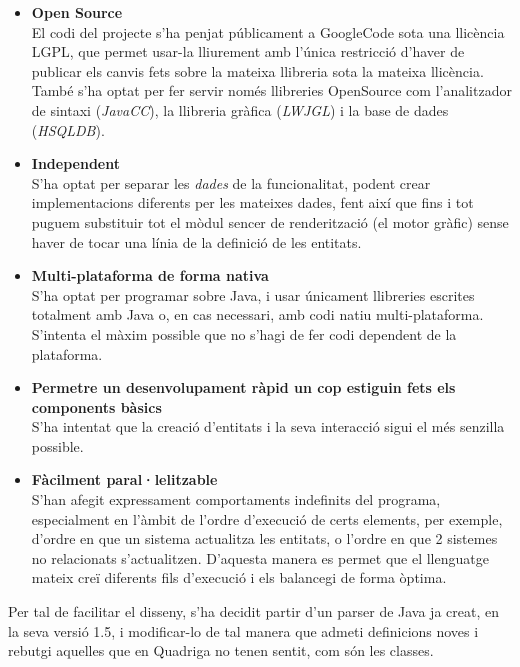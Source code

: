   \begin{itemize}
    \item {\bf Open Source} \hfill \\
      El codi del projecte s'ha penjat públicament a GoogleCode sota una llicència LGPL, que permet usar-la lliurement amb l'única restricció d'haver de publicar els canvis fets sobre la mateixa llibreria sota la mateixa llicència. També s'ha optat per fer servir només llibreries OpenSource com l'analitzador de sintaxi ({\em JavaCC}), la llibreria gràfica ({\em LWJGL}) i la base de dades ({\em HSQLDB}).
      
    \item {\bf Independent} \hfill \\
      S'ha optat per separar les {\em dades} de la funcionalitat, podent crear implementacions diferents per les mateixes dades, fent així que fins i tot puguem substituir tot el mòdul sencer de renderització (el motor gràfic) sense haver de tocar una línia de la definició de les entitats.
      
    \item {\bf Multi-plataforma de forma nativa} \hfill \\
      S'ha optat per programar sobre Java, i usar únicament llibreries escrites totalment amb Java o, en cas necessari, amb codi natiu multi-plataforma. S'intenta el màxim possible que no s'hagi de fer codi dependent de la plataforma.
      
    \item {\bf Permetre un desenvolupament ràpid un cop estiguin fets els components bàsics} \hfill \\
      S'ha intentat que la creació d'entitats i la seva interacció sigui el més senzilla possible.
      
    \item {\bf Fàcilment paral·lelitzable} \hfill \\
      S'han afegit expressament comportaments indefinits del programa, especialment en l'àmbit de l'ordre d'execució de certs elements, per exemple, d'ordre en que un sistema actualitza les entitats, o l'ordre en que 2 sistemes no relacionats s'actualitzen. D'aquesta manera es permet que el llenguatge mateix creï diferents fils d'execució i els balancegi de forma òptima.
  \end{itemize}

  Per tal de facilitar el disseny, s'ha decidit partir d'un parser de Java ja creat, en la seva versió 1.5, i modificar-lo de tal manera que admeti definicions noves i rebutgi aquelles que en Quadriga no tenen sentit, com són les classes.
  
